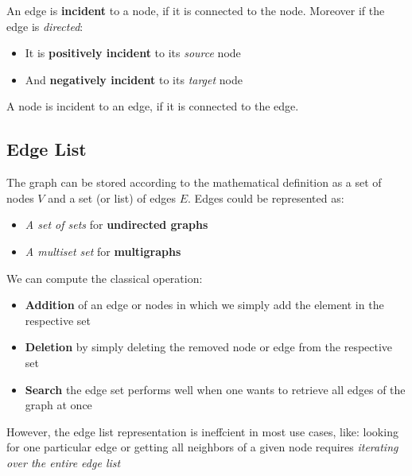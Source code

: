 \begin{tcolorbox}
An edge is \textbf{incident} to a node, if it is connected to the node. Moreover if the edge is \textit{directed}:
\begin{itemize}
    \item It is \textbf{positively incident} to its \textit{source} node
    \item And \textbf{negatively incident} to its \textit{target} node
\end{itemize}
A node is incident to an edge, if it is connected to the edge.
\end{tcolorbox}

\subsection{Edge List}
The graph can be stored according to the mathematical definition as a set of nodes \(V\) and a set (or list) of edges \(E\). Edges could be represented as:
\begin{itemize}
    \item \textit{A set of sets} for \textbf{undirected graphs}
    \item \textit{A multiset set} for \textbf{multigraphs}
\end{itemize}
We can compute the classical operation:
\begin{itemize}
    \item \textbf{Addition} of an edge or nodes in which we simply add the element in the respective set
    \item \textbf{Deletion} by simply deleting the removed node or edge from the respective set
    \item \textbf{Search} the edge set performs well when one wants to retrieve all edges of the graph at once
\end{itemize}
However, the edge list representation is ineffcient in most use cases, like: looking for one particular edge or getting all neighbors of a given node requires \textit{iterating over the entire edge list}

